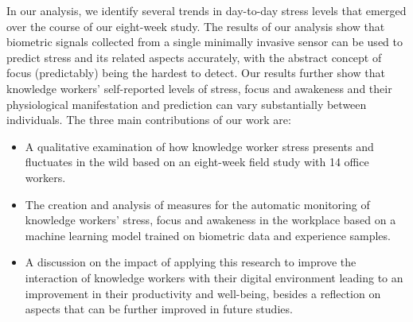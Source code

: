 In our analysis, we identify several trends in day-to-day stress levels
that emerged over the course of our eight-week study.  The results of
our analysis  show that biometric signals collected from a single
minimally invasive sensor can be used to predict stress and its
related aspects accurately, with the abstract concept of focus
(predictably) being the hardest to detect. Our results further show
that knowledge workers' self-reported levels of stress, focus and
awakeness and their physiological manifestation and prediction can
vary substantially between individuals.
The three main contributions of our work are:
\begin{itemize}
	\item A qualitative examination of how knowledge worker stress presents and fluctuates in the wild based on an eight-week field study with 14 office workers.
	\item The creation and analysis of measures for the automatic monitoring of knowledge workers' stress, focus and awakeness in the workplace based on a machine learning model trained on biometric data and experience samples.
	\item A discussion on the impact of applying this research to improve
the interaction of knowledge workers with their digital environment leading to an improvement in their productivity and well-being, besides a reflection on aspects that can be further improved in future studies.
    \end{itemize}

